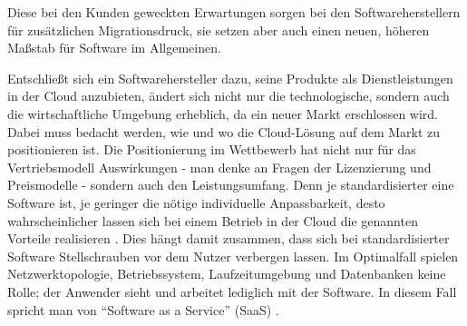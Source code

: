 Diese bei den Kunden geweckten Erwartungen sorgen bei den Softwareherstellern
für zusätzlichen Migrationsdruck, sie setzen aber auch einen neuen, höheren
Maßstab für Software im Allgemeinen.

Entschließt sich ein Softwarehersteller dazu, seine Produkte
als Dienstleistungen in der Cloud anzubieten, ändert sich nicht nur die
technologische, sondern auch die wirtschaftliche Umgebung erheblich, da ein
neuer Markt erschlossen wird. Dabei muss bedacht werden, wie und wo die
Cloud-Lösung auf dem Markt zu positionieren ist. Die Positionierung im Wettbewerb hat
nicht nur für das Vertriebsmodell  Auswirkungen - man
denke an Fragen der Lizenzierung und Preismodelle - sondern auch den
Leistungsumfang. Denn je standardisierter eine Software ist, je
geringer die nötige individuelle Anpassbarkeit, desto wahrscheinlicher lassen sich bei einem
Betrieb in der
Cloud die genannten Vorteile realisieren . Dies
hängt damit zusammen, dass sich bei standardisierter Software Stellschrauben
vor dem Nutzer verbergen lassen. Im Optimalfall spielen Netzwerktopologie,
Betriebssystem, Laufzeitumgebung und Datenbanken keine Rolle; der Anwender
sieht und arbeitet lediglich mit der Software. In diesem Fall spricht man von
"`Software as a Service"' (SaaS) .


